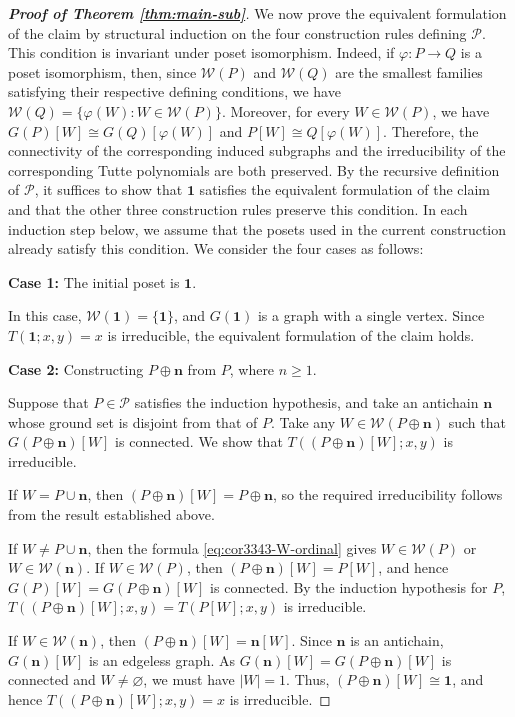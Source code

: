 \documentclass[10pt,a4paper]{amsart}
\begin{document}
\begin{proof}[\rm\textbf{Proof of Theorem \ref{thm:main-sub}}]
We now prove the equivalent formulation of the claim
by structural induction on the four construction rules
defining $\mathcal P$.
This condition is invariant under poset isomorphism.
Indeed, if $\varphi:P\to Q$ is a poset isomorphism,
then, since $\mathcal W(P)$ and $\mathcal W(Q)$
are the smallest families satisfying their respective
defining conditions, we have
$\mathcal W(Q)=\{\varphi(W):W\in\mathcal W(P)\}$.
Moreover, for every $W\in\mathcal W(P)$, we have
$G(P)[W]\cong G(Q)[\varphi(W)]$
and $P[W]\cong Q[\varphi(W)]$.
Therefore, the connectivity of the corresponding induced subgraphs
and the irreducibility of the corresponding Tutte polynomials
are both preserved.
By the recursive definition of $\mathcal P$,
it suffices to show that $\mathbf1$ satisfies the equivalent
formulation of the claim and that the other three construction rules
preserve this condition.
In each induction step below, we assume that the posets used
in the current construction already satisfy this condition.
We consider the four cases as follows:

\textbf{Case 1:} The initial poset is $\mathbf1$.

In this case, $\mathcal W(\mathbf1)=\{\mathbf1\}$,
and $G(\mathbf1)$ is a graph with a single vertex.
Since $T(\mathbf1;x,y)=x$ is irreducible,
the equivalent formulation of the claim holds.

\textbf{Case 2:} Constructing $P\oplus\mathbf n$ from $P$,
where $n\geq1$.

Suppose that $P\in\mathcal P$ satisfies the induction hypothesis,
and take an antichain $\mathbf n$ whose ground set is disjoint
from that of $P$.
Take any $W\in\mathcal W(P\oplus\mathbf n)$ such that
$G(P\oplus\mathbf n)[W]$ is connected.
We show that $T((P\oplus\mathbf n)[W];x,y)$ is irreducible.

If $W=P\cup\mathbf n$, then
$(P\oplus\mathbf n)[W]=P\oplus\mathbf n$,
so the required irreducibility follows
from the result established above.

If $W\neq P\cup\mathbf n$, then the formula \eqref{eq:cor3343-W-ordinal}
gives $W\in\mathcal W(P)$ or $W\in\mathcal W(\mathbf n)$.
If $W\in\mathcal W(P)$, then
$(P\oplus\mathbf n)[W]=P[W]$,
and hence $G(P)[W]=G(P\oplus\mathbf n)[W]$ is connected.
By the induction hypothesis for $P$,
$T((P\oplus\mathbf n)[W];x,y)=T(P[W];x,y)$ is irreducible.

If $W\in\mathcal W(\mathbf n)$, then
$(P\oplus\mathbf n)[W]=\mathbf n[W]$.
Since $\mathbf n$ is an antichain,
$G(\mathbf n)[W]$ is an edgeless graph.
As $G(\mathbf n)[W]=G(P\oplus\mathbf n)[W]$ is connected
and $W\neq\varnothing$, we must have $|W|=1$.
Thus, $(P\oplus\mathbf n)[W]\cong\mathbf1$, and hence
$T((P\oplus\mathbf n)[W];x,y)=x$ is irreducible.


\end{proof}
\end{document}

